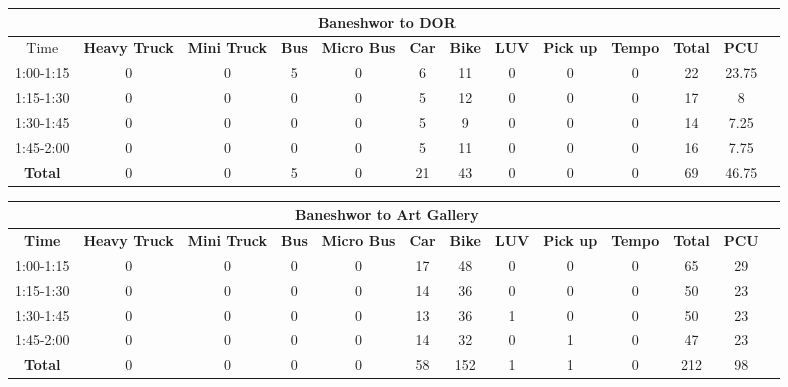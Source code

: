 \begin{landscape}
\centering
\begin{table}[h!]
\centering
\begin{tabular}{|c|c|c|c|c|c|c|c|c|c|c|c|c|}
    \hline
    \multicolumn{12}{|c|}{\textbf{Baneshwor to DOR}} \\
    \hline
        Time & \textbf{Heavy Truck} & \textbf{Mini Truck} & \textbf{Bus} & \textbf{Micro Bus} & \textbf{Car} & \textbf{Bike} & \textbf{LUV} & \textbf{Pick up} & \textbf{Tempo} & \textbf{\textbf{Total}} & \textbf{PCU} \\
    \hline
1:00-1:15	&0	&0	&5	&0	&6	&11	&0	&0	&0	&22	&23.75 \\ \hline
1:15-1:30	&0	&0	&0	&0	&5	&12	&0	&0	&0	&17	&8 \\ \hline
1:30-1:45	&0	&0	&0	&0	&5	&9	&0	&0	&0	&14	&7.25 \\ \hline
1:45-2:00	&0	&0	&0	&0	&5	&11	&0	&0	&0	&16	&7.75 \\ \hline
\textbf{Total}	&0	&0	&5	&0	&21	&43	&0	&0	&0	&69	&46.75 \\ \hline
\end{tabular}

\vspace{0.5cm}

\begin{tabular}{|c|c|c|c|c|c|c|c|c|c|c|c|c|}
    \hline
    \multicolumn{12}{|c|}{\textbf{Baneshwor to Art Gallery}} \\
    \hline
    \textbf{Time} & \textbf{Heavy Truck} & \textbf{Mini Truck} & \textbf{Bus} & \textbf{Micro Bus} & \textbf{Car} & \textbf{Bike} & \textbf{LUV} & \textbf{Pick up} & \textbf{Tempo} & \textbf{\textbf{Total}} & \textbf{PCU} \\
    \hline
1:00-1:15	&0	&0	&0	&0	&17	&48	&0	&0	&0	&65	&29 \\ \hline
1:15-1:30	&0	&0	&0	&0	&14	&36	&0	&0	&0	&50	&23 \\ \hline
1:30-1:45	&0	&0	&0	&0	&13	&36	&1	&0	&0	&50	&23 \\ \hline
1:45-2:00	&0	&0	&0	&0	&14	&32	&0	&1	&0	&47	&23 \\ \hline
\textbf{Total}	&0	&0	&0	&0	&58	&152	&1	&1	&0	&212	&98 \\ \hline

\end{tabular}



\vspace{0.5cm}


\end{table}
\end{landscape}
